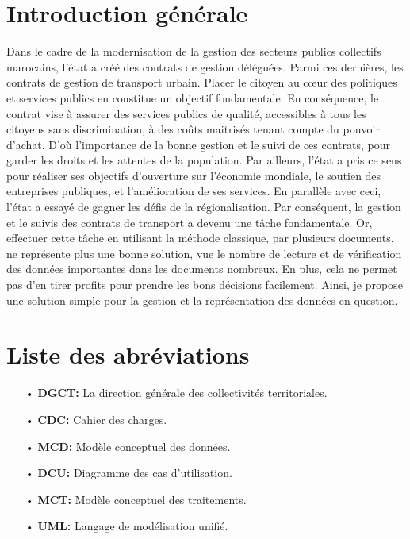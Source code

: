 \documentclass[a4paper]{report}
\begin{document}
\newpage

\begin{doublespace}
	\chapter*{\centering Introduction générale}

	Dans le cadre de la modernisation de la gestion des secteurs publics
	collectifs
	marocains, l’état a créé des contrats de gestion déléguées. Parmi ces
	dernières, les
	contrats de gestion de transport urbain. Placer le citoyen au cœur des
	politiques et
	services publics en constitue un objectif fondamentale. En conséquence, le
	contrat
	vise à assurer des services publics de qualité, accessibles à tous les
	citoyens sans discrimination, à des coûts maitrisés tenant compte du
	pouvoir
	d’achat. D'où  l'importance de la bonne gestion et le suivi de ces
	contrats, pour garder
	les droits et les attentes de la population.
	Par ailleurs, l’état a pris ce sens pour réaliser ses objectifs d’ouverture
	sur l’économie
	mondiale, le soutien des entreprises publiques, et l’amélioration de ses
	services.
	En parallèle avec ceci, l’état a essayé de gagner les défis de la
	régionalisation.
	Par conséquent, la gestion et le suivis des contrats de transport a devenu
	une tâche
	fondamentale. Or, effectuer cette tâche en utilisant la méthode classique,
	par plusieurs documents,
	ne représente plus une bonne solution, vue le nombre de lecture et de
	vérification
	des données importantes dans les documents nombreux. En plus, cela ne
	permet pas d’en
	tirer profits pour prendre les bons décisions facilement. Ainsi, je propose
	une
	solution simple pour la gestion et la représentation des données en
	question.

	\newpage

	\chapter*{\centering Liste des abréviations}
	\begin{itemize}
		\item[•] \textbf{DGCT:} La direction générale des collectivités territoriales.
		\item[•] \textbf{CDC:} Cahier des charges.
		\item[•] \textbf{MCD:} Modèle conceptuel des données.
		\item[•] \textbf{DCU:} Diagramme des cas d'utilisation.
		\item[•] \textbf{MCT:} Modèle conceptuel des traitements.
		\item[•] \textbf{UML:} Langage de modélisation unifié.
	\end{itemize}


\end{doublespace}
\end{document}
